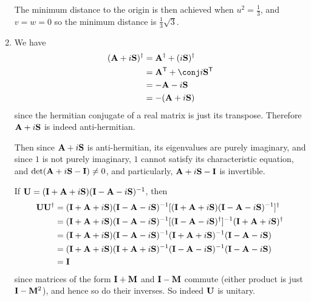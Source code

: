 \documentclass[fleqn,a4paper,11pt]{article}
\begin{document}
\begin{enumerate}[label=\textbf{\arabic*.}]
  The minimum distance to the origin is then achieved when \(u^2 = \frac 13\),
  and \(v = w = 0\) so the minimum distance is \(\frac 13 \sqrt 3\).
 \item
  We have
  \begin{align*}
   \herm{(\mat A + i\mat S)}
   &= \herm{\mat A} + \herm{(i \mat S)} \\
   &= \tran{\mat A} + \conj i \tran{\mat S} \\
   &= -\mat A - i \mat S \\
   &= -(\mat A + i \mat S)
  \end{align*}
  since the hermitian conjugate of a real matrix is just its transpose.
  Therefore \(\mathbf{A} + i\mathbf{S}\) is indeed anti-hermitian.

  Then since \(\mathbf{A} + i\mathbf{S}\) is anti-hermitian,
  its eigenvalues are purely imaginary, and since \(1\) is not purely imaginary,
  \(1\) cannot satisfy its characteristic equation, and
  \(\det(\mathbf{A} + i \mathbf{S} - \mathbf{I}) \ne 0\), and particularly,
  \(\mathbf{A} + i \mathbf{S} - \mathbf{I}\) is invertible.

  If \(\mathbf{U} = (\mathbf{I} + \mathbf{A} + i \mathbf{S})(\mathbf{I} - \mathbf{A} - i\mathbf{S})^{-1}\),
  then
  \begin{align*}
   \mathbf{U} \mathbf{U}^\dag
   &= (\mathbf{I} + \mathbf{A} + i \mathbf{S})
      (\mathbf{I} - \mathbf{A} - i\mathbf{S})^{-1}
      [(\mathbf{I} + \mathbf{A} + i \mathbf{S})
      (\mathbf{I} - \mathbf{A} - i\mathbf{S})^{-1}]^\dag \\
   &= (\mathbf{I} + \mathbf{A} + i \mathbf{S})
      (\mathbf{I} - \mathbf{A} - i\mathbf{S})^{-1}
      [(\mathbf{I} - \mathbf{A} - i\mathbf{S})^\dag]^{-1}
      (\mathbf{I} + \mathbf{A} + i \mathbf{S})^\dag \\
   &= (\mathbf{I} + \mathbf{A} + i \mathbf{S})
      (\mathbf{I} - \mathbf{A} - i\mathbf{S})^{-1}
      (\mathbf{I} + \mathbf{A} + i\mathbf{S})^{-1}
      (\mathbf{I} - \mathbf{A} - i \mathbf{S}) \\
   &= (\mathbf{I} + \mathbf{A} + i \mathbf{S})
      (\mathbf{I} + \mathbf{A} + i\mathbf{S})^{-1}
      (\mathbf{I} - \mathbf{A} - i\mathbf{S})^{-1}
      (\mathbf{I} - \mathbf{A} - i \mathbf{S}) \\
   &= \mathbf{I}
  \end{align*}
  since matrices of the form \(\mathbf{I} + \mathbf{M}\) and \(\mathbf{I} - \mathbf{M}\)
  commute (either product is just \(\mathbf{I} - \mathbf{M}^2\)), and hence so do their
  inverses. So indeed \(\mathbf{U}\) is unitary.


\end{enumerate}
\end{document}
